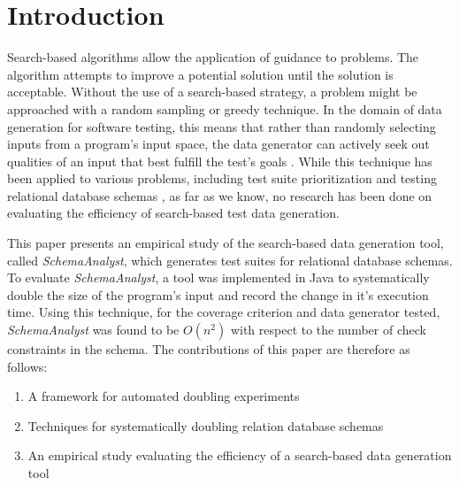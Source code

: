 \section{Introduction}

Search-based algorithms allow the application of guidance to problems.
The algorithm attempts to improve a potential solution until the
solution is acceptable. Without the use of a search-based strategy, a
problem might be approached with a random sampling or greedy
technique. In the
domain of data generation for software testing, this means that rather
than randomly selecting inputs from a program's input space, the data
generator can actively seek out qualities of an input that best fulfill
the test's goals \cite{McMinn2004a}. While this
technique has been applied to various problems, including test suite
prioritization \cite{Walcott:tsp} and testing
relational database schemas \cite{Kapfhammer2013}, 
as far as we know, no research has been done on evaluating the efficiency
of search-based test data generation. 

This paper presents an empirical study of the search-based data
generation tool, called \textit{SchemaAnalyst}, which generates test suites for
relational database schemas.  To evaluate \textit{SchemaAnalyst}, a tool
was implemented in Java to systematically double the size of the
program's input and record the change in it's execution time. Using this
technique, for the coverage criterion and data generator tested, 
\textit{SchemaAnalyst} was found to be $O(n^2)$ with respect
to the number of check constraints in the schema. The contributions of
this paper are therefore as follows:

\begin{enumerate}
  \item A framework for automated doubling experiments
  \item Techniques for systematically doubling relation database schemas
  \item An empirical study evaluating the efficiency of a search-based
    data generation tool
  \end{enumerate}
